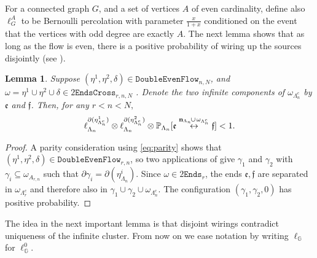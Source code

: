 \documentclass[article,11pt,reqno]{amsart}
\newcommand{\cc}{\leftrightarrow}
\newcommand{\nn}{\mathbf{n}}
\newtheorem{lemma}[theorem]{Lemma}
\begin{document}
For a connected graph $G$, and a set of vertices $A$ of even cardinality, define also $\ell_{G}^A$ to be Bernoulli percolation with parameter $\frac{x}{1+x}$ conditioned on the event that the vertices with odd degree are exactly $A$.
The next lemma shows that as long as the flow is even, there is a positive probability of wiring up the sources disjointly (see ). 
\begin{lemma}\label{lemma:disjoint_wiring_new}
 Suppose $(\eta^1,\eta^2, \delta) \in \mathtt{DoubleEvenFlow}_{n,N}$, and $\omega = \eta^1 \cup \eta^2 \cup \delta \in 2\mathtt{EndsCross}_{r,n,N}$ . Denote the two infinite components of $\omega_{\Lambda_n^c}$ by $\mathfrak{e}$ and $\mathfrak{f}$. Then, for any $r<n<N,$
 \begin{align*}
     \ell^{\partial(\eta^1_{\Lambda_n^c})}_{\Lambda_n} \otimes \ell^{\partial(\eta^2_{\Lambda_n^c})}_{\Lambda_n}  \otimes \mathbb{P}_{\Lambda_n}[\mathfrak{e} \overset{\nn_{\Lambda_n}\hspace{-1pt}\cup \hspace{1pt}\omega_{\Lambda_n^c}}{ \cc} \mathfrak{f}] < 1.
 \end{align*}
\end{lemma}
\begin{proof}
A parity consideration using \eqref{eq:parity} shows that $(\eta^1,\eta^2, \delta) \in \mathtt{DoubleEvenFlow}_{r,n}$, so two applications of  give $\gamma_1$ and $\gamma_2$ with $\gamma_i \subseteq \omega_{A_{r,n}}$ such that $\partial \gamma_i =\partial (\eta_{\Lambda_n}^i)$.
Since $\omega \in  2\mathtt{Ends}_{r}$, the ends $\mathfrak{e},\mathfrak{f}$ are separated in $\omega_{\Lambda_r^c}$ and therefore also in $\gamma_1\cup\gamma_2 \cup \omega_{\Lambda_n^c}$.
The configuration $(\gamma_1, \gamma_2,0)$ has positive probability.

\end{proof}

 The idea in the next important lemma is that disjoint wirings contradict uniqueness of the infinite cluster. From now on we ease notation by writing $\ell_\mathbb{G}$ for $\ell^0_\mathbb{G}$.
\end{document}
